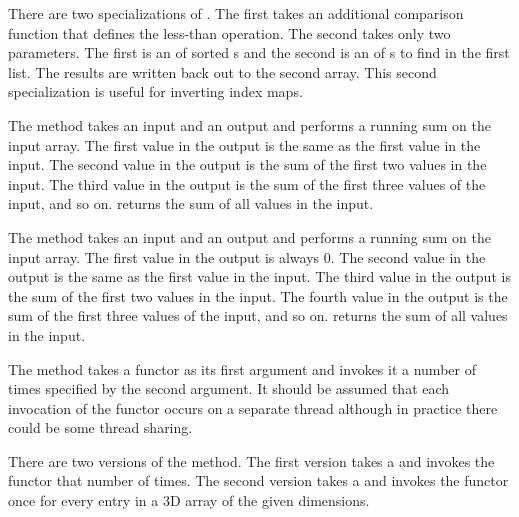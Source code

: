 \begin{description}
  There are two specializations of . The first takes
  an additional comparison function that defines the less-than
  operation. The second takes only two parameters. The first is an
   of sorted s and the second is an
   of s to find in the first list. The
  results are written back out to the second array. This second
  specialization is useful for inverting index maps.
\item[\textcode{ScanInclusive}]  The
   method takes an input and an output
   and performs a running sum on the input
  array. The first value in the output is the same as the first value in
  the input. The second value in the output is the sum of the first two
  values in the input. The third value in the output is the sum of the
  first three values of the input, and so on. 
  returns the sum of all values in the input.
\item[\textcode{ScanExclusive}]  The
   method takes an input and an output
   and performs a running sum on the input
  array. The first value in the output is always 0. The second value in the
  output is the same as the first value in the input. The third value in
  the output is the sum of the first two values in the input. The fourth
  value in the output is the sum of the first three values of the input,
  and so on.  returns the sum of all values in the
  input.
\item[\textcode{Schedule}]  The  method
  takes a functor as its first argument and invokes it a number of times
  specified by the second argument. It should be assumed that each
  invocation of the functor occurs on a separate thread although in
  practice there could be some thread sharing.

  There are two versions of the  method. The first
  version takes a  and invokes the functor that number of
  times. The second version takes a  and invokes the functor once
  for every entry in a 3D array of the given dimensions.


\end{description}
